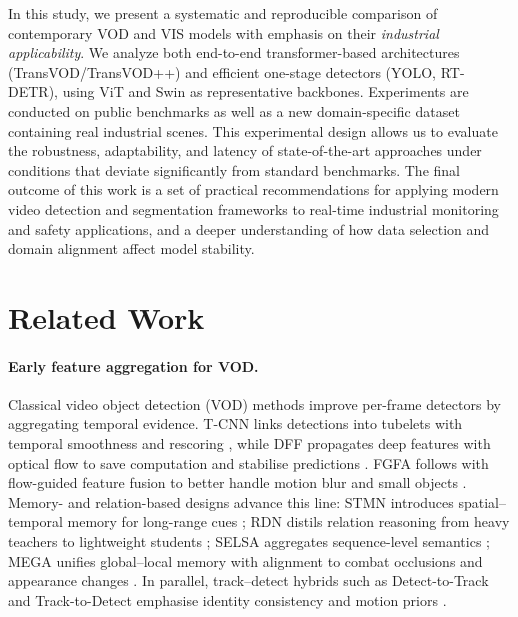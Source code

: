 \documentclass{article}
\begin{document}
In this study, we present a systematic and reproducible comparison of contemporary VOD and VIS models with emphasis on their \emph{industrial applicability}. We analyze both end-to-end transformer-based architectures (TransVOD/TransVOD++) and efficient one-stage detectors (YOLO, RT-DETR), using ViT and Swin as representative backbones. Experiments are conducted on public benchmarks as well as a new domain-specific dataset containing real industrial scenes. This experimental design allows us to evaluate the robustness, adaptability, and latency of state-of-the-art approaches under conditions that deviate significantly from standard benchmarks. The final outcome of this work is a set of practical recommendations for applying modern video detection and segmentation frameworks to real-time industrial monitoring and safety applications, and a deeper understanding of how data selection and domain alignment affect model stability.






\section{Related Work}

\paragraph{Early feature aggregation for VOD.}
Classical video object detection (VOD) methods improve per-frame detectors by aggregating temporal evidence. T-CNN links detections into tubelets with temporal smoothness and rescoring \citep{TCNN2016}, while DFF propagates deep features with optical flow to save computation and stabilise predictions \citep{DFF2017}. FGFA follows with flow-guided feature fusion to better handle motion blur and small objects \citep{FGFA2017}. Memory- and relation-based designs advance this line: STMN introduces spatial–temporal memory for long-range cues \citep{STMN2018}; RDN distils relation reasoning from heavy teachers to lightweight students \citep{RDN2019}; SELSA aggregates sequence-level semantics \citep{SELSA2019}; MEGA unifies global–local memory with alignment to combat occlusions and appearance changes \citep{MEGA2020}. In parallel, track–detect hybrids such as Detect-to-Track and Track-to-Detect emphasise identity consistency and motion priors \citep{DT2017}.
\end{document}

